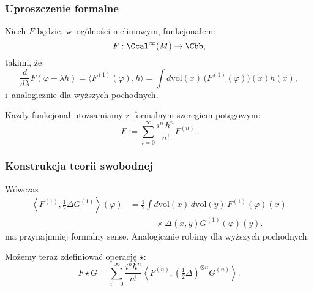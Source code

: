 \documentclass[10pt,t]{beamer}
\begin{document}
\begin{frame}
  \frametitle{Uproszczenie formalne}


  Niech $F$ będzie, w~ogólności nieliniowym, funkcjonałem:
  \begin{equation}
    \label{eq:Niespodziewane-teoretyczne-17}
    F: \Ccal^{ \infty }( M ) \rightarrow \Cbb,
  \end{equation}
  takimi, że
  \begin{equation}
    \label{eq:Niespodziewane-teoretyczne-18}
    \frac{ d }{ d \lambda } F( \varphi + \lambda h ) = \langle F^{ ( 1 ) }( \varphi ), h \rangle =
    \int d \mathrm{vol}( x )\, \big( F^{ ( 1 ) }( \varphi ) \big)( x ) h( x ),
  \end{equation}
  i~analogicznie dla wyższych pochodnych.

  Każdy funkcjonał utożsamiamy z~formalnym szeregiem potęgowym:
  \begin{equation}
    \label{eq:Niespodziewane-teoretyczne-19}
    F :=
    \sum\limits_{ i = 0 }^{ \infty } \frac{ i^{ n } \, \hbar^{ n } }{ n! } F^{ ( n ) }.
  \end{equation}

\end{frame}





\begin{frame}
  \frametitle{Konstrukcja teorii swobodnej}


  Wówczas
  \begin{equation}
    \label{eq:Niespodziewane-teoretyczne-20}
    \begin{split}
      \left\langle F^{ ( 1 ) }, \frac{ 1 }{ 2 } \Delta G^{ ( 1 ) } \right\rangle( \varphi )
      &=
        \frac{ 1 }{ 2 }
        \int d \mathrm{vol}( x ) \, d \mathrm{vol}( y ) \,
        F^{ ( 1 ) }( \varphi )( x ) \\
      &\hspace{3em} \times \Delta( x, y ) G^{ ( 1 ) }( \varphi )( y ).
    \end{split}
  \end{equation}
  ma przynajmniej formalny sense. Analogicznie robimy dla wyższych
  pochodnych.

  Możemy teraz zdefiniować operację $\star$:
  \begin{equation}
    \label{eq:Niespodziewane-teoretyczne-21}
    F \star G =
    \sum\limits_{ i = 0 }^{ \infty } \frac{ i^{ n } \hbar^{ n } }{ n! }
    \left\langle F^{ ( n ) }, \left( \tfrac{ 1 }{ 2 } \Delta \right)^{ \otimes n }
      G^{ ( n ) } \right\rangle.
    \end{equation}

\end{frame}
\end{document}
